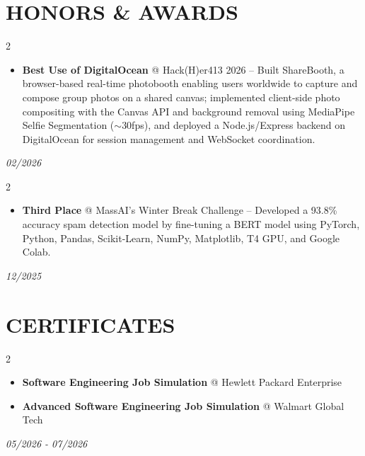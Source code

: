 \documentclass[10pt, letterpaper]{article}
\newenvironment{highlights}{
    \begin{itemize}[
        topsep=0.03 cm,
        parsep=0.03 cm,
        partopsep=0pt,
        itemsep=0pt,
        leftmargin=0.4 cm + 10pt
    ]
}{
    \end{itemize}
} %
\newenvironment{twocolentry}[2][]{
    \onecolentry
    \def\secondColumn{#2}
    \setcolumnwidth{\fill, 3.5 cm}
    \begin{paracol}{2}
}{
    \switchcolumn \raggedleft \secondColumn
    \end{paracol}
    \endonecolentry
} %
\let\hrefWithoutArrow\href
\renewcommand{\href}[2]{\hrefWithoutArrow{#1}{\ifthenelse{\equal{#2}{}}{ }{#2 }\raisebox{.15ex}{\footnotesize \faExternalLink*}}}
\begin{document}
\section{HONORS \& AWARDS}
    \begin{twocolentry}{\textit{02/2026}}
        \begin{highlights}
            \item \textbf{Best Use of DigitalOcean} @ Hack(H)er413 2026 -- Built ShareBooth, a browser-based real-time photobooth enabling users worldwide to capture and compose group photos on a shared canvas; implemented client-side photo compositing with the Canvas API and background removal using MediaPipe Selfie Segmentation ($\sim$30fps), and deployed a Node.js/Express backend on DigitalOcean for session management and WebSocket coordination. \href{https://devpost.com/software/sharebooth}{\color{primaryColor}\textbf{[Link]}}
        \end{highlights}
    \end{twocolentry}
    \vspace{0.01 cm}
    \begin{twocolentry}{\textit{12/2025}}
        \begin{highlights}
            \item \textbf{Third Place} @ MassAI's Winter Break Challenge -- Developed a 93.8\% accuracy spam detection model by fine-tuning a BERT model using PyTorch, Python, Pandas, Scikit-Learn, NumPy, Matplotlib, T4 GPU, and Google Colab. \href{https://drive.google.com/file/d/1bab9sEDANkSiQ6V9LCSk-4JHYkVCS-hB/view?usp=sharing}{\color{primaryColor}\textbf{[Link]}}
        \end{highlights}
    \end{twocolentry}
    \vspace{0.01 cm}
    
\section{CERTIFICATES}
    \begin{twocolentry}{\textit{05/2026 - 07/2026}}
        \begin{highlights}
            \item \textbf{Software Engineering Job Simulation} @ Hewlett Packard Enterprise \href{https://drive.google.com/file/d/1iJvIiQNItVOZxWZ6VBBic19yz2Na3on2/view?usp=sharing}{\color{primaryColor}\textbf{[Link]}}
        \end{highlights}

        \begin{highlights}
            \item \textbf{Advanced Software Engineering Job Simulation} @ Walmart Global Tech\hspace{0.3em}\href{https://drive.google.com/file/d/1qynGV6iEPqKgzxHvRzFGKix1NJ_9T7My/view?usp=sharing}{\color{primaryColor}\textbf{[Link]}}
        \end{highlights}
    \end{twocolentry}
\end{document}
